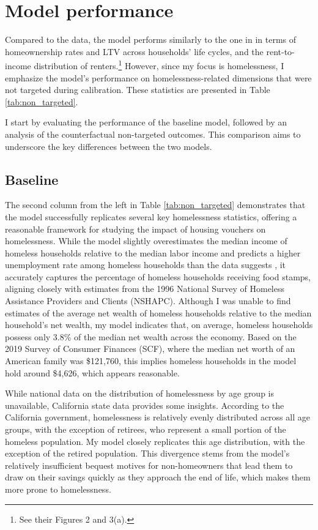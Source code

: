 \documentclass[parskip=full]{article}
\begin{document}
\section{Model performance}\label{sec:model_performance}
Compared to the data, the model performs similarly to the one in \citet{rs-2023} in terms of homeownership rates and LTV across households' life cycles, and the rent-to-income distribution of renters.\footnote{See their Figures 2 and 3(a).} However, since my focus is homelessness, I emphasize the model's performance on homelessness-related dimensions that were not targeted during calibration. These statistics are presented in Table \ref{tab:non_targeted}. 

I start by evaluating the performance of the baseline model, followed by an analysis of the counterfactual non-targeted outcomes. This comparison aims to underscore the key differences between the two models.

\subsection{Baseline}

The second column from the left in Table \ref{tab:non_targeted} demonstrates that the model successfully replicates several key homelessness statistics, offering a reasonable framework for studying the impact of housing vouchers on homelessness. While the model slightly overestimates the median income of homeless households relative to the median labor income and predicts a higher unemployment rate among homeless households than the data suggests \citep{meyeretal-2021}, it accurately captures the percentage of homeless households receiving food stamps, aligning closely with estimates from the 1996 National Survey of Homeless Assistance Providers and Clients (NSHAPC). Although I was unable to find estimates of the average net wealth of homeless households relative to the median household's net wealth, my model indicates that, on average, homeless households possess only 3.8\% of the median net wealth across the economy. Based on the 2019 Survey of Consumer Finances (SCF), where the median net worth of an American family was \$121,760, this implies homeless households in the model hold around \$4,626, which appears reasonable. 

While national data on the distribution of homelessness by age group is unavailable, California state data provides some insights. According to the California government, homelessness is relatively evenly distributed across all age groups, with the exception of retirees, who represent a small portion of the homeless population. My model closely replicates this age distribution, with the exception of the retired population. This divergence stems from the model's relatively insufficient bequest motives for non-homeowners that lead them to draw on their savings quickly as they approach the end of life, which makes them more prone to homelessness.
\end{document}
